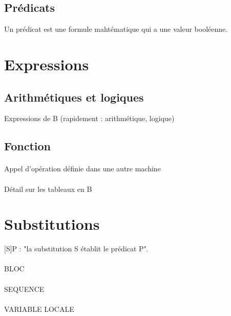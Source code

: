 \subsection{Prédicats}

Un prédicat est une formule mahtématique qui a une valeur booléenne.


\section{Expressions}

\subsection{Arithmétiques et logiques} 
Expressions de B (rapidement : arithmétique, logique)

\subsection{Fonction}

\paragraph{}
Appel d'opération définie dans une autre machine

\paragraph{}
Détail sur les tableaux en B


\section{Substitutions}
[S]P : "la substitution S établit le prédicat P".

\paragraph{}
BLOC

\paragraph{}
SEQUENCE

\paragraph{}
VARIABLE LOCALE

